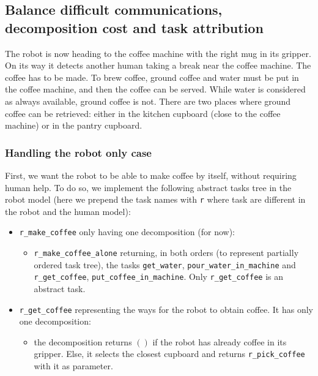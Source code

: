 \documentclass[a4paper,11pt,twoside]{StyleThese}
\begin{document}
\subsection{Balance difficult communications, decomposition cost and task attribution}
The robot is now heading to the coffee machine with the right mug in its gripper. On its way it detects another human taking a break near the coffee machine. The coffee has to be made. To brew coffee, ground coffee and water must be put in the coffee machine, and then the coffee can be served. While water is considered as always available, ground coffee is not. There are two places where ground coffee can be retrieved: either in the kitchen cupboard (close to the coffee machine) or in the pantry cupboard. 

\subsubsection{Handling the robot only case}
\label{subsubsec:chap4coffeerobotonly}
 First, we want the robot to be able to make coffee by itself, without requiring human help. To do so, we implement the following abstract tasks tree in the robot model (here we prepend the task names with \verb'r' where task are different in the robot and the human model):

\begin{itemize}
\item \verb'r_make_coffee' only having one decomposition (for now):
	\begin{itemize}
	\item \verb'r_make_coffee_alone' returning, in both orders (to represent partially ordered task tree), the tasks \verb'get_water', \verb'pour_water_in_machine' and \verb'r_get_coffee', \verb'put_coffee_in_machine'. Only \verb'r_get_coffee' is an abstract task.
	\end{itemize}
\item \verb'r_get_coffee' representing the ways for the robot to obtain coffee. It has only one decomposition:
	\begin{itemize}
	\item the decomposition returns $()$ if the robot has already coffee in its gripper. Else, it selects the closest cupboard and returns \verb'r_pick_coffee' with it as parameter.
	\end{itemize}
\end{itemize}
\end{document}
